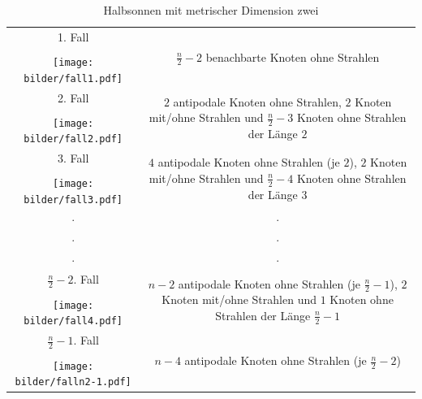 \begin{table}[htp]
\centering
 \renewcommand{\arraystretch}{2}
\begin{tabularx}{\textwidth}{||c|c||}
\hline\hline
\vspace{0.3mm}
1. Fall& \multirow{3}{121mm}{$\frac{n}{2}-2$ benachbarte Knoten ohne Strahlen}\\
\cline{1-1}
\vspace{-6mm}
&\\
	\texttt{[image: bilder/fall1.pdf]}&\\
\hline\hline
\vspace{0.3mm}
2. Fall&\multirow{3}{121mm}{$2$ antipodale Knoten ohne Strahlen, $2$ Knoten mit/ohne Strahlen und $\frac{n}{2}-3$ Knoten ohne Strahlen der Länge $2$}\\
\cline{1-1}
\vspace{-6mm}&\\
\texttt{[image: bilder/fall2.pdf]}&\\
\hline\hline
\vspace{0.3mm}
3. Fall&\multirow{3}{121mm}{ $4$ antipodale Knoten ohne Strahlen (je $2$), $2$ Knoten mit/ohne Strahlen und $\frac{n}{2}-4$ Knoten ohne Strahlen der Länge $3$}\\
\cline{1-1}
\vspace{-6mm}&\\
\texttt{[image: bilder/fall3.pdf]}&\\
\hline\hline
$\cdot$ &  $\cdot$\\
$\cdot$ &  $\cdot$\\
$\cdot$ &  $\cdot$\\
\hline\hline
\vspace{0.3mm}
$\frac{n}{2}-2$. Fall&\multirow{3}{121mm}{$n-2$ antipodale Knoten ohne Strahlen (je $\frac{n}{2}-1$), $2$ Knoten mit/ohne Strahlen und $1$ Knoten ohne Strahlen der Länge $\frac{n}{2}-1$}\\
\cline{1-1}
\vspace{-6mm}&\\
\texttt{[image: bilder/fall4.pdf]}&\\
\hline\hline
\vspace{0.3mm}
$\frac{n}{2}-1$. Fall&\multirow{3}{121mm}{$n-4$ antipodale Knoten ohne Strahlen (je $\frac{n}{2}-2$)}\\
\cline{1-1}
\vspace{-6mm}&\\
\texttt{[image: bilder/falln2-1.pdf]}&\\
\hline\hline
\end{tabularx}
\caption{Halbsonnen mit metrischer Dimension zwei}
\label{fallunterscheidungungeradesonnen2md}
\end{table}
\newpage
